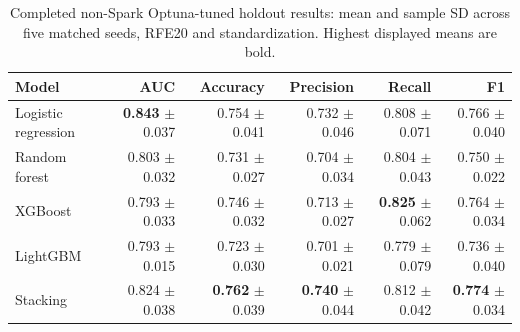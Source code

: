 \begin{table}[H]
\centering\small
\caption{Completed non-Spark Optuna-tuned holdout results: mean and sample SD across five matched seeds, RFE20 and standardization. Highest displayed means are bold.}
\label{tab:holdout-optuna-test}
\begin{tabular}{lrrrrr}
\toprule
Model & AUC & Accuracy & Precision & Recall & F1 \\
\midrule
Logistic regression & \textbf{0.843} $\pm$ 0.037 & 0.754 $\pm$ 0.041 & 0.732 $\pm$ 0.046 & 0.808 $\pm$ 0.071 & 0.766 $\pm$ 0.040 \\
Random forest & 0.803 $\pm$ 0.032 & 0.731 $\pm$ 0.027 & 0.704 $\pm$ 0.034 & 0.804 $\pm$ 0.043 & 0.750 $\pm$ 0.022 \\
XGBoost & 0.793 $\pm$ 0.033 & 0.746 $\pm$ 0.032 & 0.713 $\pm$ 0.027 & \textbf{0.825} $\pm$ 0.062 & 0.764 $\pm$ 0.034 \\
LightGBM & 0.793 $\pm$ 0.015 & 0.723 $\pm$ 0.030 & 0.701 $\pm$ 0.021 & 0.779 $\pm$ 0.079 & 0.736 $\pm$ 0.040 \\
Stacking & 0.824 $\pm$ 0.038 & \textbf{0.762} $\pm$ 0.039 & \textbf{0.740} $\pm$ 0.044 & 0.812 $\pm$ 0.042 & \textbf{0.774} $\pm$ 0.034 \\
\bottomrule
\end{tabular}
\end{table}
